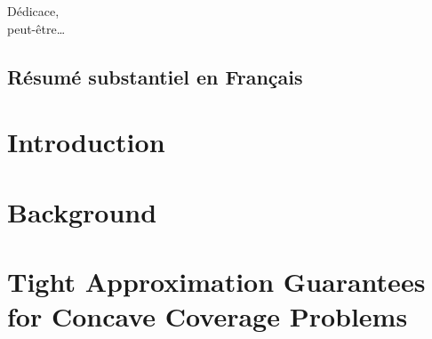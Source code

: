 \documentclass[a4paper, 11pt]{memoir}
\theoremstyle{remark}
\begin{document}
\setcounter{page}{0}

\frontmatter
 
\setcounter{page}{1}
\newpage
\thispagestyle{empty}
\mbox{}
\newpage
\thispagestyle{empty}
\begin{flushright}
\begin{otherlanguage}{french}
  Dédicace,\\
  peut-être\ldots
\end{otherlanguage}
\end{flushright}





\cleardoublepage
\frenchtableofcontents
\cleardoublepage
\tableofcontents

\cleardoublepage


\begin{otherlanguage}{french}
\chapter{Résumé substantiel en Français}
\label{chap:resume-fr}

\end{otherlanguage}

\mainmatter
\pagestyle{ruled}

\chapter{Introduction}
\label{chap:introduction}



\cleardoublepage
{\let\newpage\relax
\chapter{Background}
\label{chap:background}
}



\cleardoublepage
{\let\newpage\relax
\chapter{Tight Approximation Guarantees for Concave Coverage Problems}
\label{chap:MaxCoverage}
}
\end{document}
